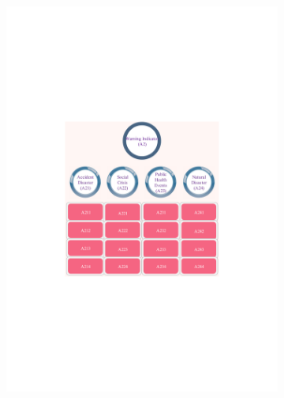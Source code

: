 \documentclass[12pt]{article}  %
\begin{document}
\begin{figure}[htbp]
\begin{subfigure}[b]{.32\textwidth}
\includegraphics[width=\textwidth]{img/2.pdf}
\end{subfigure}
\begin{subfigure}[b]{.32\textwidth}

\end{subfigure}
\end{figure}
\end{document}
